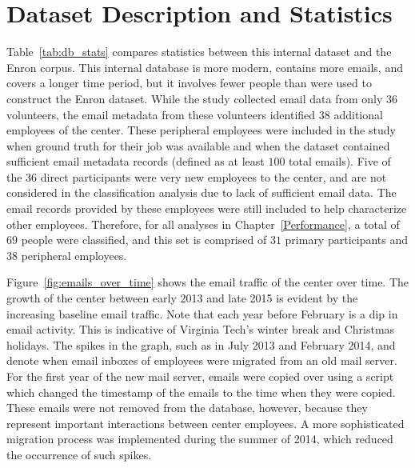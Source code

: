 \documentclass[12pt]{report}
\begin{document}
\section{Dataset Description and Statistics}
Table~\ref{tab:db_stats} compares statistics between this internal dataset and the Enron corpus.
This internal database is more modern, contains more emails, and covers a longer time period, but it involves fewer people than were used to construct the Enron dataset.
While the study collected email data from only $36$ volunteers, the email metadata from these volunteers identified $38$ additional employees of the center.
These peripheral employees were included in the study when ground truth for their job was available and when the dataset contained sufficient email metadata records (defined as at least $100$ total emails).
Five of the $36$ direct participants were very new employees to the center, and are not considered in the classification analysis due to lack of sufficient email data.
The email records provided by these employees were still included to help characterize other employees.
Therefore, for all analyses in Chapter~\ref{Performance}, a total of $69$ people were classified, and this set is comprised of $31$ primary participants and $38$ peripheral employees.

\begin{table}[t]
\centering
\caption{A comparison between the internal dataset and the Enron email corpus.}
\label{tab:db_stats}
\end{table}

Figure~\ref{fig:emails_over_time} shows the email traffic of the center over time.
The growth of the center between early 2013 and late 2015 is evident by the increasing baseline email traffic.
Note that each year before February is a dip in email activity.
This is indicative of Virginia Tech's winter break and Christmas holidays.
The spikes in the graph, such as in July 2013 and February 2014, and denote when email inboxes of employees were migrated from an old mail server.
For the first year of the new mail server, emails were copied over using a script which changed the timestamp of the emails to the time when they were copied.
These emails were not removed from the database, however, because they represent important interactions between center employees.
A more sophisticated migration process was implemented during the summer of 2014, which reduced the occurrence of such spikes.
\end{document}
